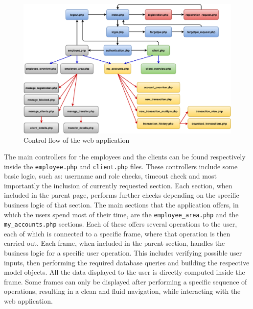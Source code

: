 \begin{figure}[h!tbp]
	\centering
	\includegraphics[width=\textwidth]{figures/view_graph}
	\caption{Control flow of the web application}
	\label{figure:view_graph}
\end{figure}
The main controllers for the employees and the clients can be found respectively inside the \texttt{employee.php} and \texttt{client.php} files. These controllers include some basic logic, such as: username and role checks, timeout check and most importantly the inclusion of currently requested section.\newline
Each section, when included in the parent page, performs further checks depending on the specific business logic of that section. The main sections that the \gnb{} application offers, in which the users spend most of their time, are the \texttt{employee\_area.php} and the \texttt{my\_accounts.php} sections. Each of these offers several operations to the user, each of which is connected to a specific frame, where that operation is then carried out.\newline
Each frame, when included in the parent section, handles the business logic for a specific user operation. This includes verifying possible user inputs, then performing the required database queries and building the respective model objects. All the data displayed to the user is directly computed inside the frame. Some frames can only be displayed after performing a specific sequence of operations, resulting in a clean and fluid navigation, while interacting with the web application.\newline

